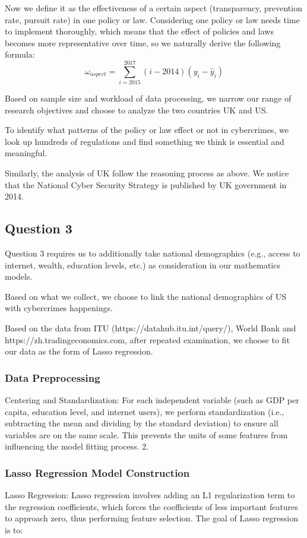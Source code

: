 \documentclass[12pt]{article}
\begin{document}
	 Now we define it as the effectiveness of a certain aspect (transparency, prevention rate, pursuit rate) in one policy or law. Considering one policy or law needs time to implement thoroughly, which means that the effect of policies and laws becomes more representative over time, so we naturally derive the following formula:
	 \[\omega_{aspect} = \sum_{i=2015}^{2017}(i-2014)(y_i - \hat{y}_i)\]
	 

	 
	 Based on sample size and workload of data processing, we narrow our range of research objectives and choose to analyze the two countries UK and US.
	 
	  To identify what patterns of the policy or law effect or not in cybercrimes, we look up hundreds of regulations and find something we think is essential and meaningful.
	 
	 Similarly, the analysis of UK follow the reasoning process as above. We notice that the National Cyber Security Strategy is published by UK government in 2014.
	

	
	\subsection{Question 3}
	
	Question 3 requires us to additionally take national demographics (e.g., access to internet, wealth, education levels, etc.) as consideration in our mathematics models.
	
	Based on what we collect, we choose to link the national demographics of US with  cybercrimes happenings.
	
	
	Based on the data from ITU (https://datahub.itu.int/query/), World Bank and https://zh.tradingeconomics.com, after repeated examination, we choose to fit our data as the form of Lasso regression.
	
		\subsubsection{ Data Preprocessing}
	Centering and Standardization: For each independent variable (such as GDP per capita, education level, and internet users), we perform standardization (i.e., subtracting the mean and dividing by the standard deviation) to ensure all variables are on the same scale. This prevents the units of some features from influencing the model fitting process.
	2. \subsubsection{Lasso Regression Model Construction}
	Lasso Regression: Lasso regression involves adding an L1 regularization term to the regression coefficients, which forces the coefficients of less important features to approach zero, thus performing feature selection. The goal of Lasso regression is to:
	
\end{document}
